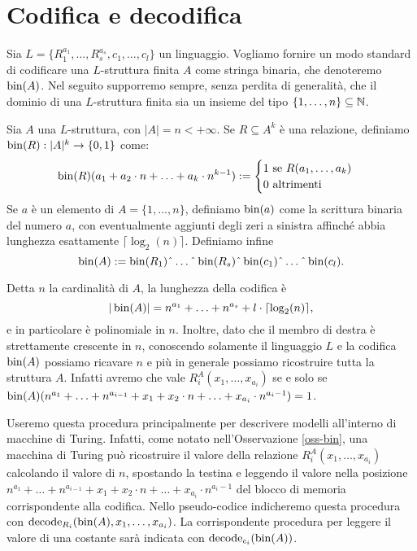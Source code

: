 \section{Codifica e decodifica}
Sia $L=\{R^{a_1}_1, \ldots, R^{a_s}_s, c_1, \ldots, c_l\}$ un linguaggio.
Vogliamo fornire un modo standard di codificare una $L$-struttura finita $A$ come
stringa binaria, che denoteremo $\operatorname{bin}(A)$. Nel seguito supporremo sempre, senza
perdita di generalità, che
il dominio di una $L$-struttura finita sia un insieme del tipo
$\{1,\ldots,n\} \subseteq \mathbb{N}$.

\begin{definizione}
  Sia $A$ una $L$-struttura, con $|A| = n < +\infty$.
  Se $R \subseteq A^k$ è una relazione,
  definiamo $\operatorname{bin}(R): |A|^k \to \{0,1\}$ come:
  \[\operatorname{bin}(R)(a_1 + a_2 \cdot n + \ldots + a_k \cdot n^{k-1}):=
    \begin{cases}
      1 \mbox{ se } R(a_1,\ldots,a_k) \\
      0 \mbox{ altrimenti}
    \end{cases}
  \]
  Se $a$ è un elemento di $A=\{1,\ldots,n\}$, definiamo $\operatorname{bin}(a)$ come la
  scrittura binaria del numero $a$, con eventualmente aggiunti degli zeri a
  sinistra affinché abbia lunghezza esattamente $\lceil \log_2(n) \rceil$.
  Definiamo infine
  \[\bin(A):=\bin(R_1)\string^\ldots\string^\bin(R_s)\string^\bin(c_1)\string^\ldots\string^\bin(c_l).\]
\end{definizione}

\begin{osservazione}
\label{oss-bin}
 Detta $n$ la cardinalità di $A$, la lunghezza della codifica è
 \[ |\operatorname{bin}(A)|=n^{a_1} + \ldots + n^{a_s} + l \cdot \lceil \log_2(n) \rceil, \]
 e in particolare è polinomiale in $n$. Inoltre, dato che il membro di destra è
 strettamente crescente in $n$, conoscendo solamente il linguaggio $L$ e la codifica $\operatorname{bin}(A)$
 possiamo ricavare $n$ e più in generale possiamo ricostruire tutta la struttura $A$.
 Infatti avremo che vale $R_i^A(x_1,\ldots, x_{a_i})$ se e solo se
 $\operatorname{bin}(A)(n^{a_1} + \ldots + n^{a_{i-1}} + x_1 + x_2 \cdot n + \ldots + x_{a_i} \cdot n^{a_i-1}) = 1$.
\end{osservazione}
Useremo questa procedura principalmente per descrivere modelli all'interno
di macchine di Turing. Infatti, come notato nell'Osservazione \ref{oss-bin},
una macchina di Turing può ricostruire
il valore della relazione $R_i^A(x_1, \ldots, x_{a_i})$ calcolando il valore
di $n$, spostando la testina e leggendo il valore nella posizione
$n^{a_1} + \ldots + n^{a_{i-1}} + x_1 + x_2 \cdot n + \ldots + x_{a_i} \cdot n^{a_i-1}$
del blocco di memoria corrispondente alla codifica.
Nello pseudo-codice indicheremo questa procedura con
$\operatorname{decode}_{R_i}(\operatorname{bin}(A), x_1, \ldots, x_{a_i})$. La corrispondente procedura per
leggere il valore di una costante sarà indicata con $\operatorname{decode}_{c_i} (\operatorname{bin}(A))$.

